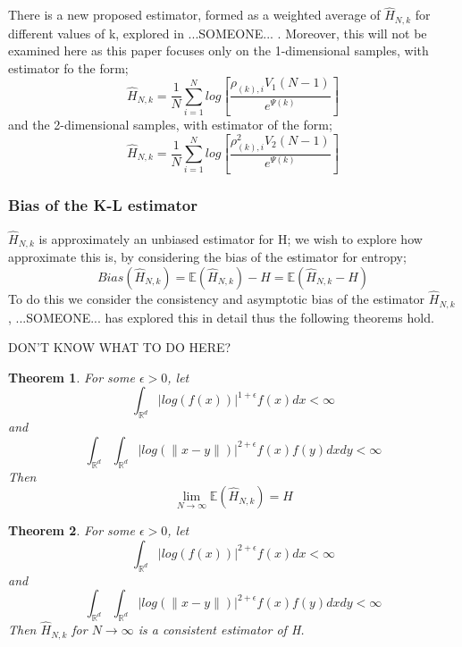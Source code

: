 \documentclass{article}
\newtheorem{theorem}{Theorem}
\begin{document}
There is a new proposed estimator, formed as a weighted average of $\hat{H}_{N, k}$ for different values of k, explored in ...SOMEONE... . Moreover, this will not be examined here as this paper focuses only on the 1-dimensional samples, with estimator fo the form;
\begin{equation} \nonumber
\hat{H}_{N, k} = \frac{1}{N} \sum_{i=1}^{N} log \left[ \frac{\rho_{(k),i} V_{1} (N-1)}{e^{\Psi(k)}} \right]
\end{equation}
and the 2-dimensional samples, with estimator of the form;
\begin{equation} \nonumber
\hat{H}_{N, k} = \frac{1}{N} \sum_{i=1}^{N} log \left[ \frac{\rho_{(k),i}^{2} V_{2} (N-1)}{e^{\Psi(k)}} \right]
\end{equation}



\subsubsection{Bias of the K-L estimator}
$\hat{H}_{N, k}$ is approximately an unbiased estimator for H; we wish to explore how approximate this is, by considering the bias of the estimator for entropy;
\begin{equation} \label{Bias}
Bias(\hat{H}_{N, k} ) = \mathbb{E}(\hat{H}_{N, k}) - H = \mathbb{E}(\hat{H}_{N, k} - H)
\end{equation}
To do this we consider the consistency and asymptotic bias of the estimator $\hat{H}_{N, k}$, ...SOMEONE... has explored this in detail thus the following theorems hold.

DON'T KNOW WHAT TO DO HERE?

\begin{theorem} \label{Paper1Thm1}
For some $\epsilon > 0$, let
\begin{equation}
\int_{\mathbb{R}^{d}} | log(f(x))|^{1 + \epsilon} f(x) dx < \infty
\end{equation}
and
\begin{equation}
\int_{\mathbb{R}^{d}} \int_{\mathbb{R}^{d}} | log(\|x-y\|)|^{2+ \epsilon} f(x) f(y) dx dy < \infty
\end{equation}
Then
\begin{equation}
\lim_{N \to \infty} \mathbb{E} (\hat{H}_{N, k}) = H
\end{equation}
\end{theorem}

\begin{theorem} \label{Paper1Thm2-Consistency}
For some $\epsilon > 0$, let
\begin{equation}
\int_{\mathbb{R}^{d}} | log(f(x))|^{2 + \epsilon} f(x) dx < \infty
\end{equation}
and
\begin{equation}
\int_{\mathbb{R}^{d}} \int_{\mathbb{R}^{d}} | log(\|x-y\|)|^{2+ \epsilon} f(x) f(y) dx dy < \infty
\end{equation}
Then $\hat{H}_{N, k}$ for $N \to \infty$ is a consistent estimator of H.
\end{theorem}
\end{document}
